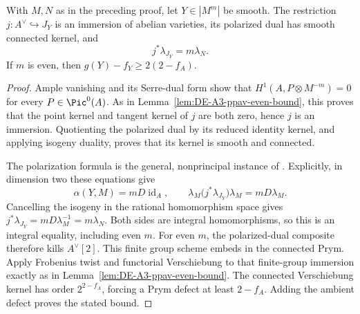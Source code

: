 \begin{lemma}
\label{lem:DE-A3-general-polarization-Prym}
With $M,N$ as in the preceding proof, let $Y\in|M^m|$ be smooth.
The restriction $j:A^\vee\hookrightarrow J_Y$ is an immersion of
abelian varieties, its polarized dual has smooth connected kernel,
and
\[
                   j^*\lambda_{J_Y}=m\lambda_N.
\]
If $m$ is even, then $g(Y)-f_Y\ge2(2-f_A)$.
\end{lemma}
\begin{proof}
Ample vanishing and its Serre-dual form show that
$H^1(A,P\otimes M^{-m})=0$ for every $P\in\Pic^0(A)$.
As in Lemma~\ref{lem:DE-A3-ppav-even-bound}, this proves that the
point kernel and tangent kernel of $j$ are both zero, hence $j$ is
an immersion.  Quotienting the polarized dual by its reduced identity
kernel, and applying isogeny duality, proves that its kernel is
smooth and connected.

The polarization formula is the general, nonprincipal instance of
\cite[Section~3, equations~(3.2)--(3.3), pp.~346--347]
{Debarre1994Degrees}.  Explicitly, in dimension two these equations
give
\[
 \alpha(Y,M)=mD\operatorname{id}_A,
 \qquad
 \lambda_M\bigl(j^*\lambda_{J_Y}\bigr)\lambda_M
       =mD\lambda_M.
\]
Cancelling the isogeny in the rational homomorphism space gives
$j^*\lambda_{J_Y}=mD\lambda_M^{-1}=m\lambda_N$.
Both sides are integral homomorphisms, so this is an integral equality,
including even $m$.
For even $m$, the polarized-dual composite therefore kills
$A^\vee[2]$.  This finite group scheme embeds in the connected Prym.
Apply Frobenius twist and functorial Verschiebung to that finite-group
immersion exactly as in Lemma~\ref{lem:DE-A3-ppav-even-bound}.
The connected Verschiebung kernel has order $2^{2-f_A}$, forcing
a Prym defect at least $2-f_A$.  Adding the ambient defect proves
the stated bound.
\end{proof}

